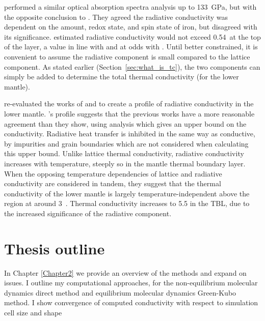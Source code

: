 \citet{Goncharov2008} performed a similar optical absorption spectra analysis up to 133~GPa, but with the opposite conclusion to \citet{Keppler2008}. They agreed the radiative conductivity was dependent on the amount, redox state, and spin state of iron, but disagreed with its significance. \citet{Goncharov2008} estimated radiative conductivity would not exceed 0.54~\wmks at the top of the \ddds layer, a value in line with \citet{Hofmeister1999} and at odds with \citet{Keppler2008}. Until better constrained, it is convenient to assume the radiative component is small compared to the lattice component. As stated earlier (Section~\ref{sec:what_is_tc}), the two components can simply be added to determine the total thermal conductivity (for the lower mantle).

\citet{Tang2014} re-evaluated the works of \citet{Keppler2008} and \citet{Goncharov2008} to create a profile of radiative conductivity in the lower mantle. \citeauthor{Tang2014}'s profile suggests that the previous works have a more reasonable agreement than they show, using analysis which gives an upper bound on the conductivity. Radiative heat transfer is inhibited in the same way as conductive, by impurities and grain boundaries which are not considered when calculating this upper bound. Unlike lattice thermal conductivity, radiative conductivity increases with temperature, steeply so in the mantle thermal boundary layer. When the opposing temperature dependencies of lattice and radiative conductivity are considered in tandem, they suggest that the thermal conductivity of the lower mantle is largely temperature-independent above the \ddds region at around 3~\wmk. Thermal conductivity increases to 5.5 \wmks in the TBL, due to the increased significance of the radiative component.








\section{Thesis outline}
In Chapter \ref{Chapter2} we provide an overview of the methods and expand on issues. I outline my computational approaches, for the non-equilibrium molecular dynamics direct method and equilibrium molecular dynamics Green-Kubo method. I show convergence of computed conductivity with respect to simulation cell size and shape 

